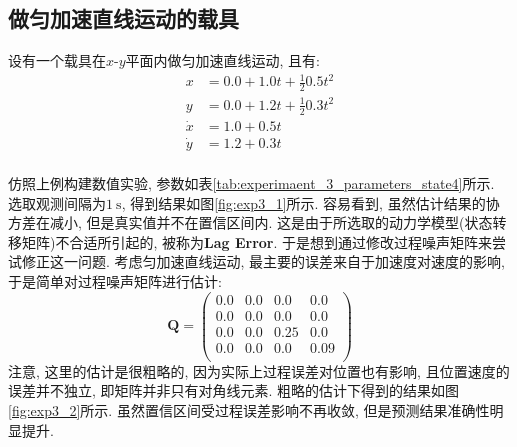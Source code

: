 \documentclass[12pt]{article}
\begin{document}
\subsection{做匀加速直线运动的载具}

设有一个载具在$x$-$y$平面内做匀加速直线运动, 且有:
\begin{equation*}
\begin{aligned}
x &= 0.0 + 1.0 t + \frac{1}{2} 0.5 t^2 \\
y & = 0.0 + 1.2 t + \frac{1}{2} 0.3 t^2 \\
\dot{x} &= 1.0 + 0.5 t \\
\dot{y} &= 1.2 + 0.3 t \\
\end{aligned}
\end{equation*}

仿照上例构建数值实验, 参数如表\ref{tab:experimaent_3_parameters_state4}所示. 选取观测间隔为$1 \ \mathrm{s}$, 得到结果如图\ref{fig:exp3_1}所示. 容易看到, 虽然估计结果的协方差在减小, 但是真实值并不在置信区间内. 这是由于所选取的动力学模型(状态转移矩阵)不合适所引起的, 被称为\textbf{Lag Error}. 于是想到通过修改过程噪声矩阵来尝试修正这一问题. 考虑匀加速直线运动, 最主要的误差来自于加速度对速度的影响, 于是简单对过程噪声矩阵进行估计:
\begin{equation*}
\bm{Q} =    
   \begin{pmatrix} %
      0.0 & 0.0 & 0.0 & 0.0\\
      0.0 & 0.0 & 0.0 & 0.0 \\
      0.0 & 0.0 & 0.25 & 0.0 \\
      0.0 & 0.0 & 0.0 & 0.09 \\
   \end{pmatrix}
\end{equation*}
注意, 这里的估计是很粗略的, 因为实际上过程误差对位置也有影响, 且位置速度的误差并不独立, 即矩阵并非只有对角线元素. 粗略的估计下得到的结果如图\ref{fig:exp3_2}所示. 虽然置信区间受过程误差影响不再收敛, 但是预测结果准确性明显提升. 
\end{document}

